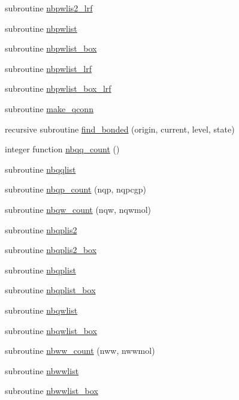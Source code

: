 \begin{DoxyCompactItemize}
subroutine \hyperlink{classmd_afe50bd0f280d3fe561677d4f3c020609}{nbpwlis2\-\_\-lrf}
\item 
subroutine \hyperlink{classmd_a7b86a40f21529aa87dd9b8f4f4dfc477}{nbpwlist}
\item 
subroutine \hyperlink{classmd_a5f189fb6f05a491403c091702df28b5d}{nbpwlist\-\_\-box}
\item 
subroutine \hyperlink{classmd_a8bc19f04d3e901b0d4a325278d0a75e1}{nbpwlist\-\_\-lrf}
\item 
subroutine \hyperlink{classmd_a3394ce94f0e3b7bfc2173c52b94f26a7}{nbpwlist\-\_\-box\-\_\-lrf}
\item 
subroutine \hyperlink{classmd_ad4df630c52378b74f2364e43877790bd}{make\-\_\-qconn}
\item 
recursive subroutine \hyperlink{classmd_a215ade3bcf0f97f2cb05253490618921}{find\-\_\-bonded} (origin, current, level, state)
\item 
integer function \hyperlink{classmd_af92ec9a00c6cb3017f0638ab89153f09}{nbqq\-\_\-count} ()
\item 
subroutine \hyperlink{classmd_a4e147e278d5903788b6a86771786784d}{nbqqlist}
\item 
subroutine \hyperlink{classmd_a6166c2d50958dc6c23672ef29758864b}{nbqp\-\_\-count} (nqp, nqpcgp)
\item 
subroutine \hyperlink{classmd_ad86c0d54152d8813e3c4ea4c6dda6af2}{nbqw\-\_\-count} (nqw, nqwmol)
\item 
subroutine \hyperlink{classmd_ac65c470c7fff34d1a0d83d34a2d26903}{nbqplis2}
\item 
subroutine \hyperlink{classmd_ae34201832881ae30b98d647f8d6b9e5c}{nbqplis2\-\_\-box}
\item 
subroutine \hyperlink{classmd_a024cb909133335c226bb615aa1fc2bcc}{nbqplist}
\item 
subroutine \hyperlink{classmd_ab7e41e412c074ffe247c7f5ddb656556}{nbqplist\-\_\-box}
\item 
subroutine \hyperlink{classmd_abb1646542a714dc1dc635a57fb6a54f2}{nbqwlist}
\item 
subroutine \hyperlink{classmd_a5e4fd443176c16b5dd369531378ac625}{nbqwlist\-\_\-box}
\item 
subroutine \hyperlink{classmd_a7c9a27e7734e6f871ce6576b2e49e156}{nbww\-\_\-count} (nww, nwwmol)
\item 
subroutine \hyperlink{classmd_a2b6f1954e4ac00c0a55ee99ef64c99d0}{nbwwlist}
\item 
subroutine \hyperlink{classmd_a9566b82fb9043677e70d135bb7bf92d8}{nbwwlist\-\_\-box}

\end{DoxyCompactItemize}

